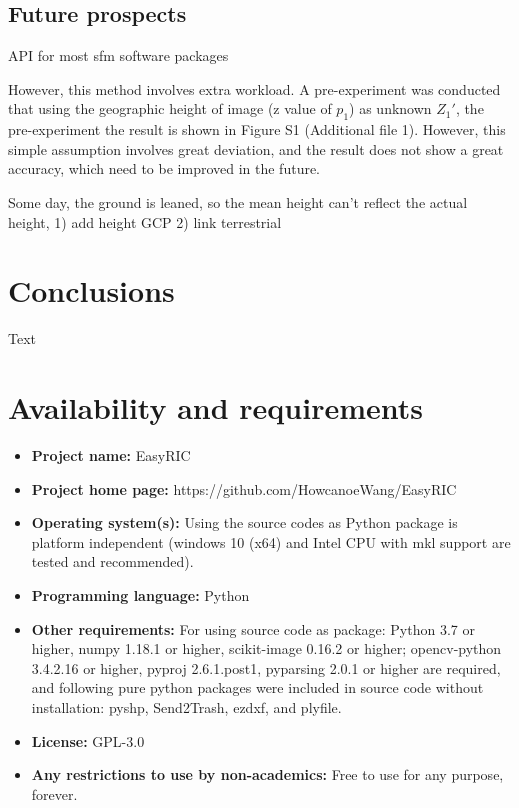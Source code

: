 \documentclass{configs/bmcart}
\begin{document}
\subsection*{Future prospects}
API for most \acrshort*{sfm} software packages

However, this method involves extra workload. A pre-experiment was conducted that using the geographic height of image (z value of $p_1$) as unknown $Z_1'$, the pre-experiment the result is shown in Figure S1 (Additional file 1). However, this simple assumption involves great deviation, and the result does not show a great accuracy, which need to be improved in the future.

Some day, the ground is leaned, so the mean height can't reflect the actual height, 1) add height GCP 2) link terrestrial


\section*{Conclusions}
Text

\section*{Availability and requirements}
\begin{itemize}
  \item \textbf{Project name:} EasyRIC
  \item \textbf{Project home page:} https://github.com/HowcanoeWang/EasyRIC
  \item \textbf{Operating system(s):} Using the source codes as Python package is platform independent (windows 10 (x64) and Intel CPU with \acrfull*{mkl} support are tested and recommended).
  \item \textbf{Programming language: } Python
  \item \textbf{Other requirements:} For using source code as package: Python 3.7 or higher, numpy 1.18.1 or higher, scikit-image 0.16.2 or higher; opencv-python 3.4.2.16 or higher, pyproj 2.6.1.post1, pyparsing 2.0.1 or higher are required, and following pure python packages were included in source code without installation: pyshp, Send2Trash, ezdxf, and plyfile.
  \item \textbf{License:} GPL-3.0
  \item \textbf{Any restrictions to use by non-academics:} Free to use for any purpose, forever.
\end{itemize}
\end{document}

